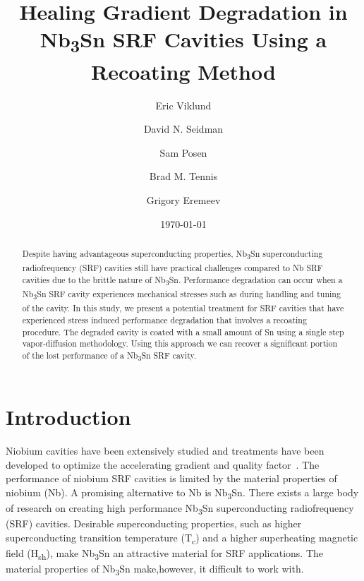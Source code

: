 \documentclass{revtex4-2}
\begin{document}
\title{Healing Gradient Degradation in Nb\textsubscript{3}Sn SRF Cavities Using a Recoating Method}
\author{Eric Viklund}
\author{David N. Seidman}
\author{Sam Posen}
\author{Brad M. Tennis}
\author{Grigory Eremeev}


\date{\today}

\begin{abstract}

    Despite having advantageous superconducting properties, Nb\textsubscript{3}Sn superconducting radiofrequency (SRF) cavities still have practical challenges compared to Nb SRF cavities due to the brittle nature of Nb\textsubscript{3}Sn. Performance degradation can occur when a Nb\textsubscript{3}Sn SRF cavity experiences mechanical stresses such as during handling and tuning of the cavity. In this study, we present a potential treatment for SRF cavities that have experienced stress induced performance degradation that involves a recoating procedure. The degraded cavity is coated with a small amount of Sn using a single step vapor-diffusion methodology. Using this approach we can recover a significant portion of the lost performance of a Nb\textsubscript{3}Sn SRF cavity.

\end{abstract}

\maketitle

\section{Introduction}
\label{sec:Introduction}

Niobium cavities have been extensively studied and treatments have been developed to optimize the accelerating gradient and quality factor~\cite{10.1063/1.4866013, 10.1063/1.4960801, 10.1063/5.0059464, 10.1063/5.0063379}. The performance of niobium SRF cavities is limited by the material properties of niobium (Nb). A promising alternative to Nb is Nb\textsubscript{3}Sn. There exists a large body of research on creating high performance Nb\textsubscript{3}Sn superconducting radiofrequency (SRF) cavities\cite{10.1063/1.4913617, 10.1063/1.4913247}. Desirable superconducting properties, such as higher superconducting transition temperature (T\textsubscript{c}) and a higher superheating magnetic field (H\textsubscript{sh})\cite{liarte2017theoretical, catelani2008temperature, lin2012effect, kubo2020superfluid}, make Nb\textsubscript{3}Sn an attractive material for SRF applications. The material properties of Nb\textsubscript{3}Sn make,however, it difficult to work with. 
\end{document}
